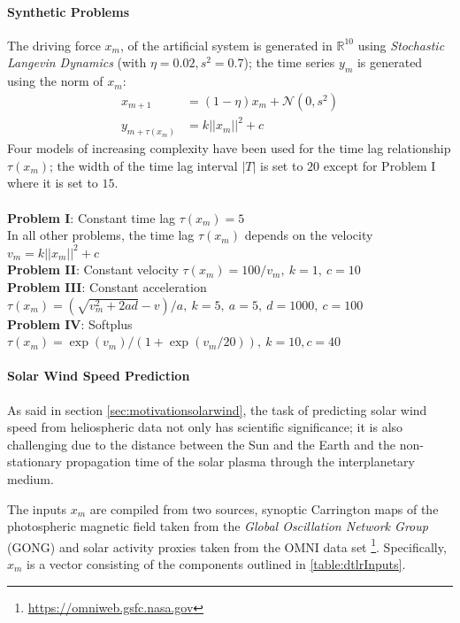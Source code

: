 \paragraph{Synthetic Problems} 
The driving force $x_m$, of the artificial system is generated in $\mathbb{R}^{10}$ using 
\emph{Stochastic Langevin Dynamics} (with $\eta = 0.02, s^2 = 0.7$); the time series $y_m$ is 
generated using the norm of $x_m$:
% 
\begin{align}
 x_{m+1} &= (1 - \eta) x_m + \mathcal{N}(0, s^2) \label{eq:data}\\
 y_{m+\tau(x_m)} &= k ||x_m||^2 + c \label{eq:outputs}
\end{align}
%
Four models of increasing complexity have been used for the time lag relationship $\tau(x_m)$; the 
width of the time lag interval $|T|$ is set to $20$ except for Problem I where it is set to $15$.
\\\\
%
{\bf Problem I}: Constant time lag $\tau(x_m) = 5$\\
%
In all other problems, the time lag $\tau(x_m)$ depends on the velocity $v_m = k ||x_m||^2 + c$\\
%
{\bf Problem II}: Constant velocity $\tau(x_m) = 100/v_m,\ k = 1,\ c = 10$\\
%
{\bf Problem III}: Constant acceleration 
$\tau(x_m) = (\sqrt{v_m^2 + 2ad} - v)/a,\ k = 5,\ a = 5,\ d = 1000, \ c = 100$
\\
%
{\bf Problem IV}: Softplus 
$\tau(x_m) = \exp\left(v_m\right)/\left(1 + \exp(v_m/20)\right), \ k = 10, c = 40$\\

\paragraph{Solar Wind Speed Prediction}\label{sec:solarwind}
As said in section \ref{sec:motivationsolarwind}, the task of predicting solar wind speed from 
heliospheric data not only has scientific significance; it is also challenging due to the distance 
between the Sun and the Earth and the non-stationary propagation time of the solar plasma through 
the interplanetary medium. 

The inputs $x_m$ are compiled from two sources, synoptic Carrington maps of the photospheric 
magnetic field taken from the \emph{Global Oscillation Network Group} (GONG) and solar activity 
proxies taken from the OMNI data set \footnote{\url{https://omniweb.gsfc.nasa.gov}}. Specifically, 
$x_m$ is a vector consisting of the components outlined in \cref{table:dtlrInputs}.

